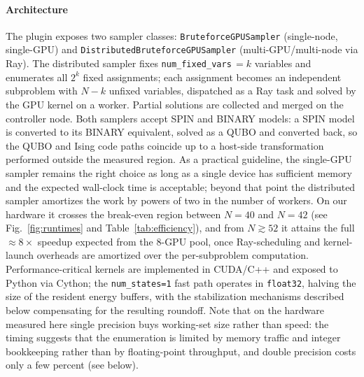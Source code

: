 \documentclass[12pt,a4paper]{elsarticle}
\begin{document}
\paragraph{Architecture}
The plugin exposes two sampler classes: \texttt{BruteforceGPUSampler}
(single-node, single-GPU) and \texttt{DistributedBruteforceGPUSampler}
(multi-GPU/multi-node via Ray). The distributed sampler fixes
\texttt{num\_fixed\_vars}\,$=k$ variables and enumerates all $2^{k}$ fixed
assignments; each assignment becomes an independent subproblem with $N-k$
unfixed variables, dispatched as a Ray task and solved by the GPU kernel on a
worker. Partial solutions are collected and merged on the controller node. Both
samplers accept SPIN and BINARY models: a SPIN model is converted to its BINARY
equivalent, solved as a QUBO and converted back, so the QUBO and Ising code
paths coincide up to a host-side transformation performed outside the measured
region. As a practical guideline, the single-GPU sampler remains the right
choice as long as a single device has sufficient memory and the expected
wall-clock time is acceptable; beyond that point the distributed sampler
amortizes the work by powers of two in the number of workers. On our hardware it
crosses the break-even region between $N=40$ and $N=42$ (see
Fig.~\ref{fig:runtimes} and Table~\ref{tab:efficiency}), and from
$N\!\gtrsim\!52$ it attains the full $\approx\!8\times$ speedup expected from
the 8-GPU pool, once Ray-scheduling and kernel-launch overheads are amortized
over the per-subproblem computation. Performance-critical kernels are
implemented in CUDA/C++ and exposed to Python via Cython; the
\texttt{num\_states=1} fast path operates in \texttt{float32}, halving the size of
the resident energy buffers, with the stabilization mechanisms described below
compensating for the resulting roundoff. Note that on the hardware measured here
single precision buys working-set size rather than speed: the timing suggests that the
enumeration is limited by memory traffic and integer bookkeeping rather than by floating-point throughput,
and double precision costs only a few percent (see below).
\end{document}

